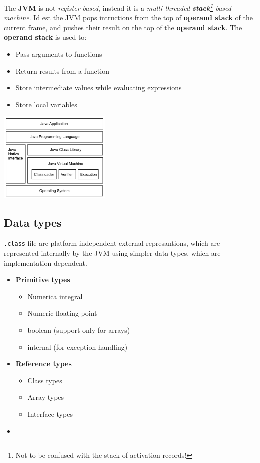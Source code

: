 The \textbf{JVM} is not \textit{register-based}, instead it is a \textit{multi-threaded \textbf{stack}\footnote{Not to be confused with the stack of activation records!} based machine}.
Id est the JVM pops intructions from the top of \textbf{operand stack} of the current frame, and pushes their result on the top of the \textbf{operand stack}. 
The \textbf{operand stack} is used to:
\begin{itemize}
    \item Pass arguments to functions
    \item Return results from a function
    \item Store intermediate values while evaluating expressions
    \item Store local variables
\end{itemize}
\begin{center}
    \includegraphics[width=0.4\textwidth]{images/Java_hierarchy.png}
\end{center}

\subsection{Data types}
\lstinline{.class} file are platform independent external represantions, which are represented internally by the JVM using simpler data types, which are implementation dependent.
\begin{itemize}
    \item \textbf{Primitive types}
    \begin{itemize}
        \item Numerica integral
        \item Numeric floating point
        \item boolean (support only for arrays)
        \item internal (for exception handling)
    \end{itemize}
    \item \textbf{Reference types}
    \begin{itemize}
        \item Class types
        \item Array types
        \item Interface types
    \end{itemize}
    \item {}
\end{itemize}

